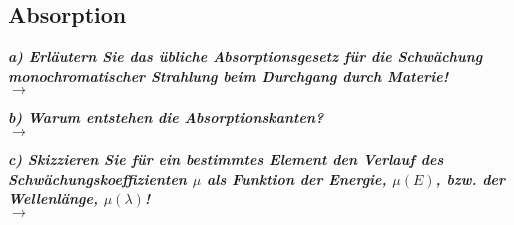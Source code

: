\subsection{\label{subsec:FZV3}Absorption}
\textbf{\textit{a) Erläutern Sie das übliche Absorptionsgesetz für die Schwächung monochromatischer
Strahlung beim Durchgang durch Materie!}}\\
$\rightarrow$

\textbf{\textit{b) Warum entstehen die Absorptionskanten?}}\\
$\rightarrow$

\textbf{\textit{c) Skizzieren Sie für ein bestimmtes Element den Verlauf des Schwächungskoeffizienten 
$\mu$ als Funktion der Energie, $\mu(E)$, bzw. der Wellenlänge, $\mu(\lambda)$!}}\\
$\rightarrow$